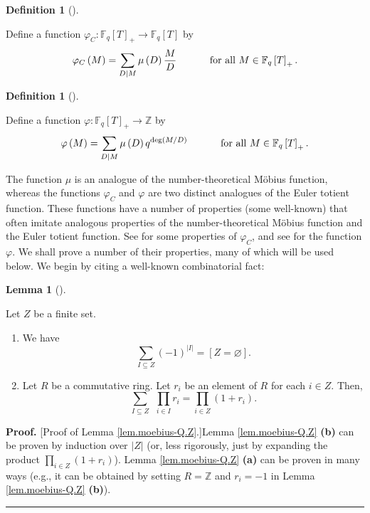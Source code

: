 \documentclass[numbers=enddot,12pt,final,onecolumn,notitlepage]{scrartcl}%
\theoremstyle{definition}
\newtheorem{lem}[theo]{Lemma}
\newenvironment{lemma}[1][]
{\begin{lem}[#1]\begin{leftbar}}
{\end{leftbar}\end{lem}}
\newtheorem{defi}[theo]{Definition}
\newenvironment{definition}[1][]
{\begin{defi}[#1]\begin{leftbar}}
{\end{leftbar}\end{defi}}
\newenvironment{proof}[1][Proof]{\noindent\textbf{#1.} }{\ \rule{0.5em}{0.5em}}
\let\sumnonlimits\sum
\let\prodnonlimits\prod
\renewcommand{\sum}{\sumnonlimits\limits}
\renewcommand{\prod}{\prodnonlimits\limits}
\begin{document}
\begin{definition}
\label{def.phiC-q}Define a function $\varphi_{C}:\mathbb{F}_{q}\left[
T\right]  _{+}\rightarrow\mathbb{F}_{q}\left[  T\right]  $ by%
\[
\varphi_{C}\left(  M\right)  =\sum\limits_{D\mid M}\mu\left(  D\right)
\dfrac{M}{D}\ \ \ \ \ \ \ \ \ \ \text{for all }M\in\mathbb{F}_{q}\left[
T\right]  _{+}.
\]

\end{definition}

\begin{definition}
\label{def.phi-q}Define a function $\varphi:\mathbb{F}_{q}\left[  T\right]
_{+}\rightarrow\mathbb{Z}$ by%
\[
\varphi\left(  M\right)  =\sum\limits_{D\mid M}\mu\left(  D\right)
q^{\deg\left(  M/D\right)  }\ \ \ \ \ \ \ \ \ \ \text{for all }M\in
\mathbb{F}_{q}\left[  T\right]  _{+}.
\]

\end{definition}

The function $\mu$ is an analogue of the number-theoretical M\"{o}bius
function, whereas the functions $\varphi_{C}$ and $\varphi$ are two distinct
analogues of the Euler totient function. These functions have a number of
properties (some well-known) that often imitate analogous properties of the
number-theoretical M\"{o}bius function and the Euler totient function. See
\cite[Theorem 4.6]{kc-carlitz} for some properties of $\varphi_{C}$, and see
\cite[Section 6]{kc-carlitz} for the function $\varphi$. We shall prove a
number of their properties, many of which will be used below. We begin by
citing a well-known combinatorial fact:

\begin{lemma}
\label{lem.moebius-Q.Z}Let $Z$ be a finite set.

\begin{enumerate}
\item[\textbf{(a)}] We have%
\[
\sum_{I\subseteq Z}\left(  -1\right)  ^{\left\vert I\right\vert }=\left[
Z=\varnothing\right]  .
\]


\item[\textbf{(b)}] Let $R$ be a commutative ring. Let $r_{i}$ be an element
of $R$ for each $i\in Z$. Then,%
\[
\sum_{I\subseteq Z}\ \ \prod_{i\in I}r_{i}=\prod_{i\in Z}\left(
1+r_{i}\right)  .
\]

\end{enumerate}
\end{lemma}

\begin{proof}
[Proof of Lemma \ref{lem.moebius-Q.Z}.]Lemma \ref{lem.moebius-Q.Z}
\textbf{(b)} can be proven by induction over $\left\vert Z\right\vert $ (or,
less rigorously, just by expanding the product $\prod_{i\in Z}\left(
1+r_{i}\right)  $). Lemma \ref{lem.moebius-Q.Z} \textbf{(a)} can be proven in
many ways (e.g., it can be obtained by setting $R=\mathbb{Z}$ and $r_{i}=-1$
in Lemma \ref{lem.moebius-Q.Z} \textbf{(b)}).
\end{proof}
\end{document}
